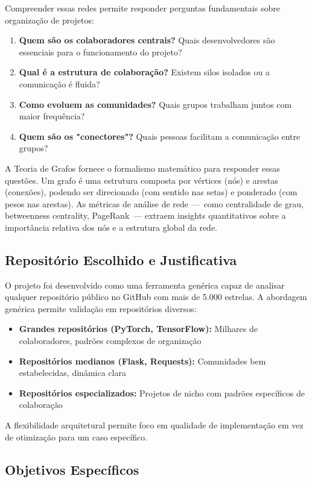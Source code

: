 \documentclass[12pt,a4paper]{article}
\begin{document}
Compreender essas redes permite responder perguntas fundamentais sobre organização de projetos:
\begin{enumerate}
  \item \textbf{Quem são os colaboradores centrais?} Quais desenvolvedores são essenciais para o funcionamento do projeto?
  \item \textbf{Qual é a estrutura de colaboração?} Existem silos isolados ou a comunicação é fluida?
  \item \textbf{Como evoluem as comunidades?} Quais grupos trabalham juntos com maior frequência?
  \item \textbf{Quem são os "conectores"?} Quais pessoas facilitam a comunicação entre grupos?
\end{enumerate}

A Teoria de Grafos fornece o formalismo matemático para responder essas questões. Um grafo é uma estrutura composta por vértices (nós) e arestas (conexões), podendo ser direcionado (com sentido nas setas) e ponderado (com pesos nas arestas). As métricas de análise de rede —~como centralidade de grau, betweenness centrality, PageRank~— extraem insights quantitativos sobre a importância relativa dos nós e a estrutura global da rede.

\subsection{Repositório Escolhido e Justificativa}

O projeto foi desenvolvido como uma ferramenta genérica capaz de analisar qualquer repositório público no GitHub com mais de 5.000 estrelas. A abordagem genérica permite validação em repositórios diversos:

\begin{itemize}
  \item \textbf{Grandes repositórios (PyTorch, TensorFlow):} Milhares de colaboradores, padrões complexos de organização
  \item \textbf{Repositórios medianos (Flask, Requests):} Comunidades bem estabelecidas, dinâmica clara
  \item \textbf{Repositórios especializados:} Projetos de nicho com padrões específicos de colaboração
\end{itemize}

A flexibilidade arquitetural permite foco em qualidade de implementação em vez de otimização para um caso específico.

\subsection{Objetivos Específicos}
\end{document}
